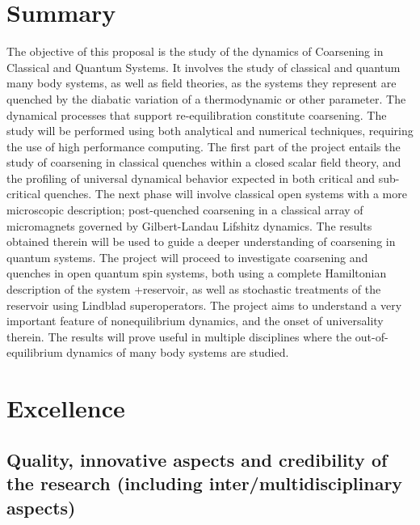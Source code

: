 \documentclass[a4paper,11pt]{article}
\begin{document}
\section{Summary}

The objective of this proposal is the study of the dynamics of Coarsening in Classical and Quantum Systems. It involves the
study of classical and quantum many body systems, as well as field theories, as the systems they represent are quenched
by the diabatic variation of a thermodynamic or other parameter. The dynamical processes that support re-equilibration
constitute coarsening. The study will be performed using both analytical and numerical techniques, requiring the use of high
performance computing. The first part of the project entails the study of coarsening in classical quenches within a
closed scalar field theory, and the profiling of universal dynamical behavior expected in both critical and sub-critical
quenches. The next phase will involve classical open systems with a more microscopic description; post-quenched
coarsening in a classical array of micromagnets governed by Gilbert-Landau Lifshitz dynamics. The results obtained therein
will be used to guide a deeper understanding of coarsening in quantum systems. The project will proceed to investigate
coarsening and quenches in open quantum spin systems, both using a complete Hamiltonian description of the system
+reservoir, as well as stochastic treatments of the reservoir using Lindblad superoperators. The project aims to understand
a very important feature of nonequilibrium dynamics, and the onset of universality therein. The results will prove useful in
multiple disciplines where the out-of-equilibrium dynamics of many body systems are studied.

\section{Excellence}
\label{sec:excellence}

\subsection{Quality, innovative aspects and credibility of the research
  (including inter/multidisciplinary aspects)}
\label{sec:excellence-quality}
\end{document}
